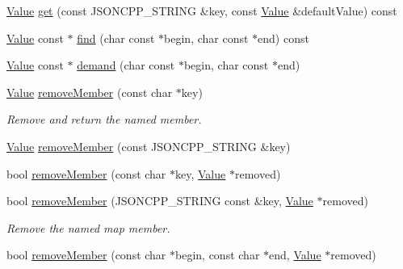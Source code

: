 \begin{DoxyCompactItemize}
\item 
\hyperlink{class_json_1_1_value}{Value} \hyperlink{class_json_1_1_value_a0d143ddad13c005d123ab30a22dbd521}{get} (const J\+S\+O\+N\+C\+P\+P\+\_\+\+S\+T\+R\+I\+NG \&key, const \hyperlink{class_json_1_1_value}{Value} \&default\+Value) const 
\item 
\hyperlink{class_json_1_1_value}{Value} const $\ast$ \hyperlink{class_json_1_1_value_a184bf49ec5da7ec31af089cf6f458f99}{find} (char const $\ast$begin, char const $\ast$end) const 
\item 
\hyperlink{class_json_1_1_value}{Value} const $\ast$ \hyperlink{class_json_1_1_value_afeb7ff596a0929d90c5f2f3cffb413ed}{demand} (char const $\ast$begin, char const $\ast$end)
\item 
\hyperlink{class_json_1_1_value}{Value} \hyperlink{class_json_1_1_value_aa52f7873b95d29627d6e83ba96f69aaa}{remove\+Member} (const char $\ast$key)
\begin{DoxyCompactList}\small\item\em Remove and return the named member. \end{DoxyCompactList}\item 
\hyperlink{class_json_1_1_value}{Value} \hyperlink{class_json_1_1_value_a1dfd5d30fbc53fcd9c4955b8b3e7885c}{remove\+Member} (const J\+S\+O\+N\+C\+P\+P\+\_\+\+S\+T\+R\+I\+NG \&key)
\item 
bool \hyperlink{class_json_1_1_value_a708e599489adf30d65bf85a8ee16e6fb}{remove\+Member} (const char $\ast$key, \hyperlink{class_json_1_1_value}{Value} $\ast$removed)
\item 
bool \hyperlink{class_json_1_1_value_ae385ecef98427970df525ee876e9f54a}{remove\+Member} (J\+S\+O\+N\+C\+P\+P\+\_\+\+S\+T\+R\+I\+NG const \&key, \hyperlink{class_json_1_1_value}{Value} $\ast$removed)
\begin{DoxyCompactList}\small\item\em Remove the named map member. \end{DoxyCompactList}\item 
bool \hyperlink{class_json_1_1_value_a49c91af727d6b4eb0af02a81bb2def87}{remove\+Member} (const char $\ast$begin, const char $\ast$end, \hyperlink{class_json_1_1_value}{Value} $\ast$removed)\hypertarget{class_json_1_1_value_a49c91af727d6b4eb0af02a81bb2def87}{}\label{class_json_1_1_value_a49c91af727d6b4eb0af02a81bb2def87}


\end{DoxyCompactItemize}
